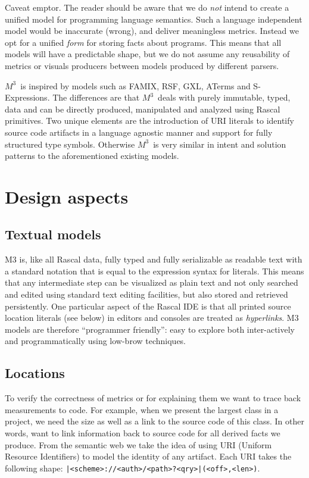 \documentclass[a4]{IEEEtran}
\newcommand{\loc}[1]{\small{\texttt{#1}}}
\newcommand{\mthree}{\ensuremath{M^3}}
\begin{document}
Caveat emptor. The reader should be aware that we do \emph{not} intend to create a unified model for programming language semantics. Such a language independent model would be inaccurate (wrong), and deliver meaningless metrics. Instead we opt for a unified \emph{form} for storing facts about programs. This means that all models will have a predictable shape, but we do not assume any reusability of metrics or visuals producers between models produced by different parsers. 

\mthree\ is inspired by models such as FAMIX, RSF, GXL, ATerms and S-Expressions. The differences are that \mthree\ deals with purely immutable, typed, data and can be directly produced, manipulated and analyzed using Rascal primitives. Two unique elements are the introduction of URI literals to identify source code artifacts in a language agnostic manner and support for fully structured type symbols. Otherwise \mthree\  is very similar in intent and solution patterns to the aforementioned existing models.

\section{Design aspects}

\subsection{Textual models}

M3 is, like all Rascal data, fully typed and fully serializable as readable text with a standard notation that is equal to the expression syntax for literals. This means that any intermediate step can be visualized as plain text and not only searched and edited using standard text editing facilities, but also stored and retrieved persistently. One particular aspect of the Rascal IDE is that all printed source location literals (see below) in editors and consoles are treated as \emph{hyperlinks}. M3 models are therefore ``programmer friendly'': easy to explore both inter-actively and programmatically using low-brow techniques.

\subsection{Locations} 

To verify the correctness of metrics or for explaining them we want to trace back measurements to code. For example, when we present the largest class in a project, we need the size as well as a link to the source code of this class. In other words, want to link information back to source code for all derived facts we produce. From the semantic web we take the idea of using URI (Uniform Resource Identifiers) to model the identity of any artifact. Each URI takes the following shape: \loc{|<scheme>://<auth>/<path>?<qry>|(<off>,<len>)}.
\end{document}

